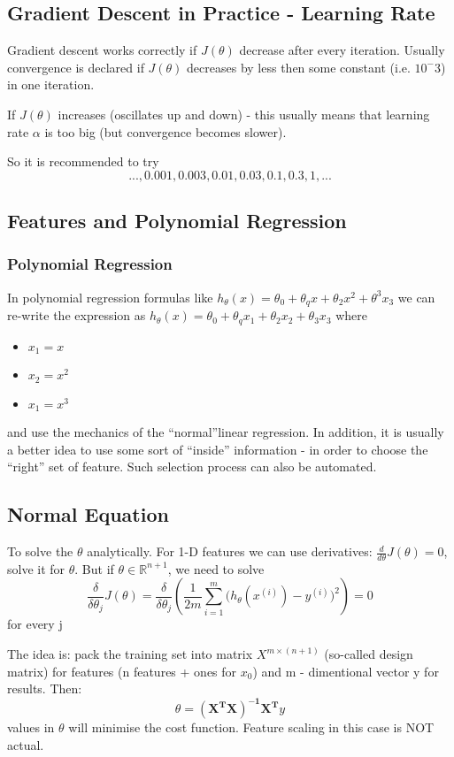 \documentclass{scrartcl}
\begin{document}
\subsection {Gradient Descent in Practice - Learning Rate}
\label {4-4}
Gradient descent works correctly if $J(\theta)$ decrease after every
iteration. Usually convergence is declared if $J(\theta)$ decreases by
less then some constant (i.e. $10^-{3}$) in one iteration.

If $J(\theta)$ increases (oscillates up and down) - this usually means
that learning rate $\alpha$ is too big (but convergence becomes
slower).

So it is recommended to try \[ ..., 0.001,0.003, 0.01, 0.03, 0.1, 0.3,
1, ...
\]
 
\subsection{Features and Polynomial Regression}
\label{4-5}
\subsubsection{Polynomial Regression}
In polynomial regression formulas like $h_\theta(x)=\theta_0 +
\theta_qx + \theta_2x^2 + \theta^3x_3$ we can re-write the expression
as $h_\theta(x) = \theta_0 + \theta_qx_1 + \theta_2x_2 + \theta_3x_3$
where \begin{itemize}
\item{$x_1=x$}
\item{$x_2=x^2$}
\item{$x_1=x^3$}
\end{itemize}
and use the mechanics of the ``normal''linear regression. In addition,
it is usually a better idea to use some sort of ``inside'' information
- in order to choose the ``right'' set of feature. Such selection
process can also be automated.

\subsection {Normal Equation}
\label{4-6}
To solve the $\theta$ analytically. For 1-D features we can use
derivatives: $\frac{d}{d\theta}J(\theta) = 0$, solve it for $\theta$.
But if $\theta \in \mathbb{R}^{n+1}$, we need to solve \[
\frac{\delta}{\delta \theta_j}J(\theta) = \frac{\delta}{\delta
  \theta_j} \left( \frac{1}{2m}
  \sum\limits_{i=1}^m\big(h_\theta(x^{(i)}) - y^{(i)}\big)^2\right) =
0
\] for every j

The idea is: pack the training set into matrix $X^{m \times (n + 1)}$
(so-called design matrix) for features (n features + ones for $x_0$)
and m - dimentional vector y for results. Then:
\[ \theta = \mathbf{\left( X^TX \right)^{-1}X^T}y \] values in
$\theta$ will minimise the cost function. Feature scaling in this case
is NOT actual.
\end{document}
